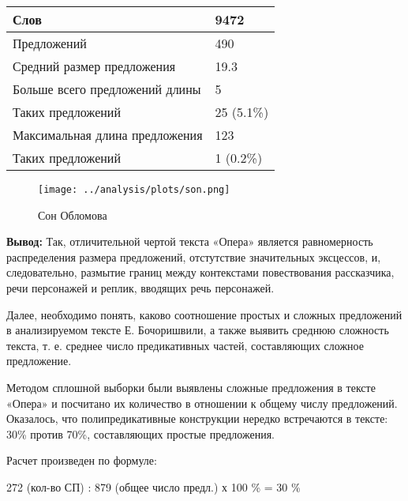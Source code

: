 \documentclass{kursa4}
\begin{document}
{{        \begin{center}
          \tablehead{}
          \begin{tabular}{|m{5.7730002cm}|m{1.6559999cm}|}
            \hline
            Слов &
            9472\\\hline
            Предложений &
            490\\\hline
            Средний размер предложения &
            19.3\\\hline
            Больше всего предложений длины &
            5\\\hline
            Таких предложений &
            25 (5.1\%)\\\hline
            Максимальная длина предложения &
            123\\\hline
            Таких предложений &
            1 (0.2\%)\\\hline
            \end{tabular}
          \end{center}
        
        \begin{figure}[htbp]
          \centering
          \texttt{[image: ../analysis/plots/son.png]}
          \caption{Сон Обломова}
        \end{figure}

        \textbf{Вывод:} Так, отличительной чертой текста «Опера» является равномерность распределения размера предложений, отстутствие значительных эксцессов, и, следовательно, размытие границ между контекстами повествования рассказчика, речи персонажей и реплик, вводящих речь персонажей. 

        Далее, необходимо понять, каково соотношение простых и сложных предложений в анализируемом тексте Е. Бочоришвили, а также выявить среднюю сложность текста, т. е. среднее число предикативных частей, составляющих сложное предложение.
        
        Методом сплошной выборки были выявлены сложные предложения в тексте «Опера» и посчитано их количество в отношении к общему числу предложений. Оказалось, что полипредикативные конструкции нередко встречаются в тексте: 30\% против 70\%, составляющих простые предложения.

        Расчет произведен по формуле: 

        {\centering
        {272 (кол-во СП) : 879 (общее число предл.) х 100 \% =
        30 \%}
        \par}

}}
\end{document}
